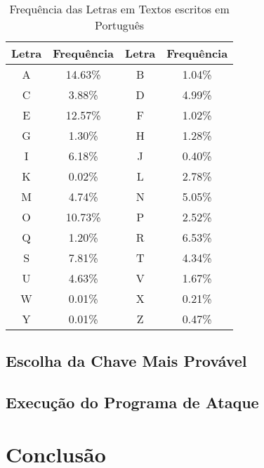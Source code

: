\documentclass[conference]{IEEEtran}
\begin{document}
\begin{table}[htbp]
\caption{Frequência das Letras em Textos escritos em Português}
\begin{center}
\begin{tabular}{|c|c|c|c|}
\hline
    Letra & Frequência & Letra & Frequência \\
\hline
    A & 14.63\% & B & 1.04\% \\
    C & 3.88\% & D & 4.99\% \\
    E & 12.57\% & F & 1.02\% \\
    G & 1.30\% & H & 1.28\% \\
    I & 6.18\% & J & 0.40\% \\
    K & 0.02\% & L & 2.78\% \\
    M & 4.74\% & N & 5.05\% \\
    O & 10.73\% & P & 2.52\% \\
    Q & 1.20\% & R & 6.53\% \\
    S & 7.81\% & T & 4.34\% \\
    U & 4.63\% & V & 1.67\% \\
    W & 0.01\% & X & 0.21\% \\
    Y & 0.01\% & Z & 0.47\% \\
\hline
\end{tabular}
\label{tab:portuguesefrequency}
\end{center}
\end{table}

\subsection{Escolha da Chave Mais Provável}
\label{sec:escolha}

\subsection{Execução do Programa de Ataque}
\label{sec:exec-attack}


\section{Conclusão} %
\label{sec:conclusion}



% 


\end{document}
